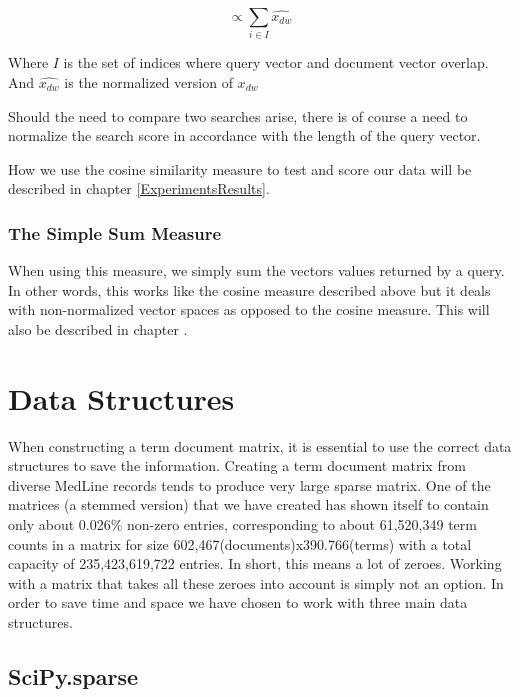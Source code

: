 \[
\propto  \sum_{i \in I} \widehat{x_{dw}}
\]

Where $I$ is the set of indices where query vector and document vector
overlap. And $\widehat{x_{dw}}$ is the normalized version of $x_{dw}$

Should the need to compare two searches arise, there is of
course a need to normalize the search score in accordance with the
length of the query vector.

How we use the cosine similarity measure to test and score our data
will be described in chapter \ref{ExperimentsResults}.


\subsubsection{The Simple Sum Measure\label{SimpleSum}}
When using this measure, we simply sum the vectors values returned by
a query. In other words, this works like the cosine measure described
above but it deals with non-normalized vector spaces as opposed to
the cosine measure. This will also be described in chapter
.

\section{Data Structures}

When constructing a term document matrix, it is essential to use the
correct data structures to save the information. Creating a term
document matrix from diverse MedLine records tends to produce very
large sparse matrix. One of the matrices (a stemmed version) that we
have created has shown itself to contain only about 0.026\% non-zero
entries, corresponding to about 61,520,349 term counts in a matrix for
size 602,467(documents)x390.766(terms) with a total capacity of
235,423,619,722 entries. In short, this means a lot of zeroes. Working
with a matrix that takes all these zeroes into account is simply not
an option. In order to save time and space we have chosen to work with three
main data structures.

\subsection{SciPy.sparse\label{SciPy_sparse}}

